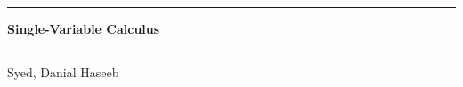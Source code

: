 \documentclass[./main.tex]{subfiles}
\begin{document}
\begin{titlepage}
    \begin{center}
        \vspace*{1cm}

        \rule{\linewidth}{2pt}
        \vspace{0.15cm}

        \Huge \textbf{Single-Variable Calculus} \\
        \vspace{0.35cm}
        \rule{\linewidth}{2pt}

        \vspace{0.5cm}

        \Large {Syed, Danial Haseeb}
    \end{center}
\end{titlepage}
\end{document}
